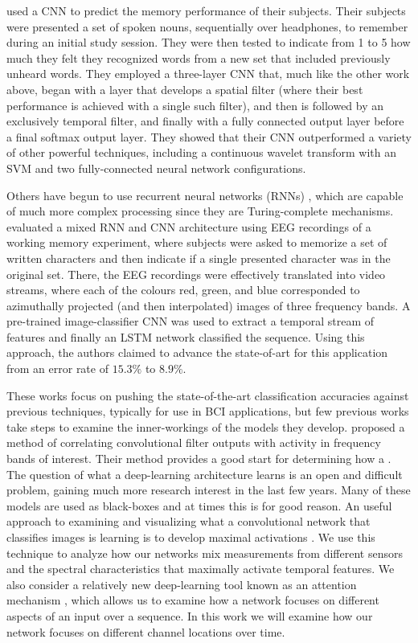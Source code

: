 \documentclass[utf8]{frontiersSCNS} %
\begin{document}
\cite{Sun} used a CNN to predict the memory performance of their subjects. Their subjects were presented a set of spoken nouns, sequentially over headphones, to remember during an initial study session. They were then tested to indicate from 1 to 5 how much they felt they recognized words from a new set that included previously unheard words. They employed a three-layer CNN that, much like the other work above, began with a layer that develops a spatial filter (where their best performance is achieved with a single such filter), and then is followed by an exclusively temporal filter, and finally with a fully connected output layer before a final softmax output layer. They showed that their CNN outperformed a variety of other powerful techniques, including a continuous wavelet transform with an SVM and two fully-connected neural network configurations. 

Others have begun to use recurrent neural networks (RNNs) \cite{Bashivan2016}, which are capable of much more complex processing since they are Turing-complete mechanisms. \cite{Bashivan2016} evaluated a mixed RNN and CNN architecture using EEG recordings of a working memory experiment, where subjects were asked to memorize a set of written characters and then indicate if a single presented character was in the original set. There, the EEG recordings were effectively translated into video streams, where each of the colours red, green, and blue corresponded to azimuthally projected (and then interpolated) images of three frequency bands. A pre-trained image-classifier CNN was used to extract a temporal stream of features and finally an LSTM network classified the sequence. Using this approach, the authors claimed to advance the state-of-art for this application from an error rate of $15.3\%$ to $8.9\%$.

These works focus on pushing the state-of-the-art classification accuracies against previous techniques, typically for use in BCI applications, but few previous works take steps to examine the inner-workings of the models they develop. \cite{Schirrmeister2017} proposed a method of correlating convolutional filter outputs with activity in frequency bands of interest. Their method provides a good start for determining how a . The question of what a deep-learning architecture learns is an open and difficult problem, gaining much more research interest in the last few years. Many of these models are used as black-boxes and at times this is for good reason. An useful approach to examining and visualizing what a convolutional network that classifies images is learning is to develop maximal activations \cite{Yosinski2015}. We use this technique to analyze how our networks mix measurements from different sensors and the spectral characteristics that maximally activate temporal features. We also consider a relatively new deep-learning tool known as an attention mechanism \cite{XuKELVINXU, Ye2017}, which allows us to examine how a network focuses on different aspects of an input over a sequence. In this work we will examine how our network focuses on different channel locations over time.
\end{document}
